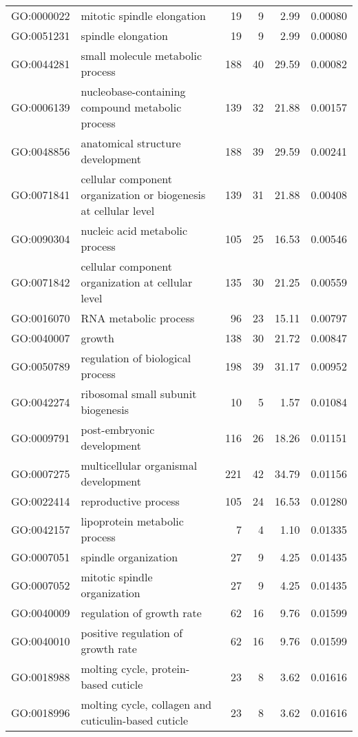 \begin{longtable}{lp{4.5cm}rrrl}
  GO:0000022 & mitotic spindle elongation &  19 &   9 & 2.99 & 0.00080 \\ 
  GO:0051231 & spindle elongation &  19 &   9 & 2.99 & 0.00080 \\ 
  GO:0044281 & small molecule metabolic process & 188 &  40 & 29.59 & 0.00082 \\ 
  GO:0006139 & nucleobase-containing compound metabolic process & 139 &  32 & 21.88 & 0.00157 \\ 
  GO:0048856 & anatomical structure development & 188 &  39 & 29.59 & 0.00241 \\ 
  GO:0071841 & cellular component organization or biogenesis at cellular level & 139 &  31 & 21.88 & 0.00408 \\ 
  GO:0090304 & nucleic acid metabolic process & 105 &  25 & 16.53 & 0.00546 \\ 
  GO:0071842 & cellular component organization at cellular level & 135 &  30 & 21.25 & 0.00559 \\ 
  GO:0016070 & RNA metabolic process &  96 &  23 & 15.11 & 0.00797 \\ 
  GO:0040007 & growth & 138 &  30 & 21.72 & 0.00847 \\ 
  GO:0050789 & regulation of biological process & 198 &  39 & 31.17 & 0.00952 \\ 
  GO:0042274 & ribosomal small subunit biogenesis &  10 &   5 & 1.57 & 0.01084 \\ 
  GO:0009791 & post-embryonic development & 116 &  26 & 18.26 & 0.01151 \\ 
  GO:0007275 & multicellular organismal development & 221 &  42 & 34.79 & 0.01156 \\ 
  GO:0022414 & reproductive process & 105 &  24 & 16.53 & 0.01280 \\ 
  GO:0042157 & lipoprotein metabolic process &   7 &   4 & 1.10 & 0.01335 \\ 
  GO:0007051 & spindle organization &  27 &   9 & 4.25 & 0.01435 \\ 
  GO:0007052 & mitotic spindle organization &  27 &   9 & 4.25 & 0.01435 \\ 
  GO:0040009 & regulation of growth rate &  62 &  16 & 9.76 & 0.01599 \\ 
  GO:0040010 & positive regulation of growth rate &  62 &  16 & 9.76 & 0.01599 \\ 
  GO:0018988 & molting cycle, protein-based cuticle &  23 &   8 & 3.62 & 0.01616 \\ 
  GO:0018996 & molting cycle, collagen and cuticulin-based cuticle &  23 &   8 & 3.62 & 0.01616 \\ 

\end{longtable}
